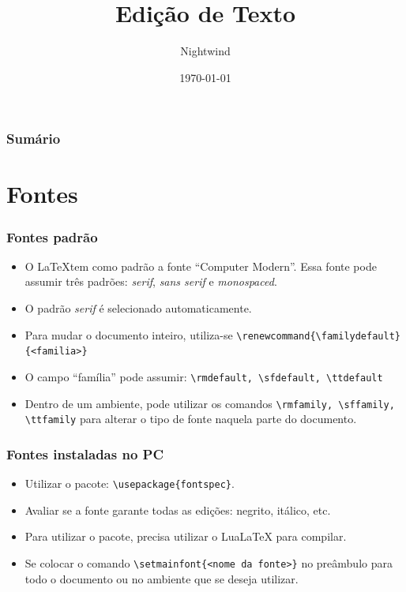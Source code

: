 \documentclass{beamer}
\title{Edição de Texto}
\author{Nightwind}
\institute[CTISM]{Colégio Técnico Industrial de Santa Maria}
\date{\today}
\begin{document}
\frame{\titlepage}

\begin{frame}
    \frametitle{Sumário}
    \tableofcontents
\end{frame}

\section{Fontes}
\begin{frame}[fragile]
    \frametitle{Fontes padrão}

    \begin{itemize}
        \item O \LaTeX tem como padrão a fonte ``Computer Modern''. Essa fonte pode assumir três padrões: \textit{serif}, \textit{sans serif} e \textit{monospaced}.
        \item O padrão \textit{serif} é selecionado automaticamente. 
        \item Para mudar o documento inteiro, utiliza-se \lstinline[style=myStyleLatex]!\renewcommand{\familydefault}{<familia>}!
        \item O campo ``família'' pode assumir: \lstinline[style=myStyleLatex]!\rmdefault, \sfdefault, \ttdefault!
        \item Dentro de um ambiente, pode utilizar os comandos \lstinline[style=myStyleLatex]!\rmfamily, \sffamily, \ttfamily! para alterar o tipo de fonte naquela parte do documento.
    \end{itemize}

\end{frame}

\begin{frame}[fragile]
    \frametitle{Fontes instaladas no PC}

    \begin{itemize}
        \item Utilizar o pacote: \lstinline[style=myStyleLatex]!\usepackage{fontspec}!. 
        \item Avaliar se a fonte garante todas as edições: negrito, itálico, etc.
        \item Para utilizar o pacote, precisa utilizar o LuaLaTeX para compilar.
        \item Se colocar o comando \lstinline[style=myStyleLatex]!\setmainfont{<nome da fonte>}! no preâmbulo para todo o documento ou no ambiente que se deseja utilizar.
    \end{itemize}

\end{frame}
\end{document}
